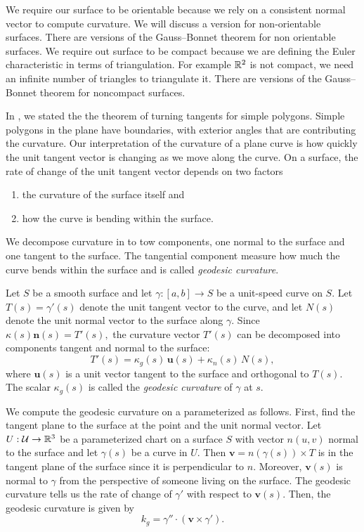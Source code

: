 We require our surface to be orientable because we rely on a consistent
normal vector to compute curvature.  We will discuss a version for non-orientable surfaces.
There are versions of the Gauss--Bonnet theorem for non orientable surfaces.
We require out surface to be compact because we are defining the Euler characteristic
in terms of triangulation. For example $\mathbb{R}^2$ is not compact, we need an infinite number of
triangles to triangulate it.
There are versions of the Gauss--Bonnet theorem for noncompact surfaces.

In , we stated the  the theorem of turning tangents for simple
polygons. Simple polygons in the plane have boundaries, with exterior angles that are contributing
the curvature.
Our interpretation of the curvature of a plane curve is how quickly the unit
tangent vector is changing as we move along the curve.
On a surface, the rate of change of the unit tangent vector depends on two factors
\begin{enumerate}
\item the curvature of the surface itself and
\item how the curve is bending within the surface.
\end{enumerate}
We decompose curvature in to tow components, one normal to the surface
and one tangent to the surface.
The tangential component measure how much the curve bends within the surface
and is called \emph{geodesic curvature}.
\begin{definition}
Let $S$ be a smooth surface and let
$\gamma:[a,b]\to S$
be a unit-speed curve on $S$. Let $T(s)=\gamma'(s)$ denote the unit
tangent vector to the curve, and let $N(s)$ denote the unit normal vector
to the surface along $\gamma$.
Since $\kappa(s)\mathbf{n}(s)=T'(s),$
the curvature vector $T'(s)$ can be decomposed into components tangent and
normal to the surface:
$$T'(s)=\kappa_g(s)\,\mathbf{u}(s)+\kappa_n(s)\,N(s),$$
where $\mathbf{u}(s)$ is a unit vector tangent to the surface and
orthogonal to $T(s)$.
The scalar $\kappa_g(s)$ is called the \emph{geodesic curvature} of
$\gamma$ at $s$.
\end{definition}


We compute the geodesic curvature on a parameterized as follows.
First, find the tangent plane to the surface at the point and the unit normal vector.
Let $U:\mathcal{U}\to \mathbb{R}^3$ be a parameterized chart on a surface $S$ with vector $n(u,v)$ normal
to the surface
and let $\gamma(s)$ be a curve in $U$.
Then $\mathbf{v}=n(\gamma(s))\times T$ is in the tangent plane of the surface since
it is perpendicular to $n$. Moreover, $\mathbf{v}(s)$ is normal to $\gamma$ 
from the perspective of someone living on the surface. 
The geodesic curvature tells us the rate of change of $\gamma'$ with respect 
to $\mathbf{v}(s)$.
Then, the geodesic curvature is given by 
\begin{equation} \label{eqn:geodesic}
	k_g=\gamma'' \cdot (\mathbf{v}\times \gamma').
\end{equation}

